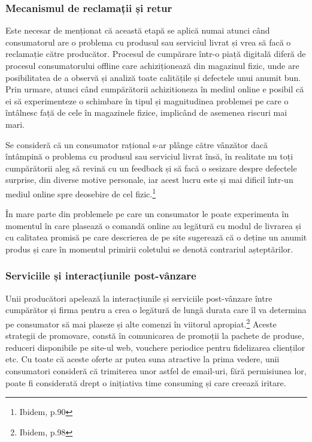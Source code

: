 \documentclass[a4paper, 12pt]{article}
\begin{document}
		\subsubsection{Mecanismul de reclamații și retur}
		
		\quad\quad Este necesar de menționat că această etapă se aplică numai atunci când consumatorul are o problema cu produsul sau serviciul livrat și vrea să facă o reclamație către producător. Procesul de cumpărare într-o piață digitală diferă de procesul consumatorului offline care achiziționează din magazinul fizic, unde are posibilitatea de a observă și analiză toate calitățile și defectele unui anumit bun. Prin urmare, atunci când cumpărătorii achizitioneza în mediul online e posibil că ei să experimenteze o schimbare în tipul și magnitudinea problemei pe care o întâlnesc față de cele în magazinele fizice, implicând de asemenea riscuri mai mari.
		
		\quad Se consideră că un consumator rațional s-ar plânge către vânzător dacă întâmpină o problema cu produsul sau serviciul livrat însă, în realitate nu toți cumpărătorii aleg să revină cu un feedback și să facă o sesizare despre defectele surprise, din diverse motive personale, iar acest lucru este și mai dificil într-un mediul online spre deosebire de cel fizic.\footnote{Ibidem, p.90}
		
		\quad În mare parte din problemele pe care un consumator le poate experimenta în momentul în care plasează o comandă online au legătură cu  modul de livrarea și cu calitatea promisă pe care descrierea de pe site sugerează că o deține un anumit produs și care în momentul primirii coletului se denotă contrariul așteptărilor.
		
		\subsubsection{Serviciile și interacțiunile post-vânzare}
		
		\quad\quad Unii producători apelează la interacțiunile și serviciile post-vânzare între cumpărător și firma pentru a crea o legătură de lungă durata care îl va determina pe consumator să mai plaseze și alte comenzi în viitorul apropiat.\footnote{Ibidem, p.98} Aceste strategii de promovare, constă în comunicarea de promoții la pachete de produse, reduceri disponibile pe site-ul web, vouchere periodice pentru fidelizarea clienților etc. Cu toate că aceste oferte ar putea suna atractive la prima vedere, unii consumatori consideră că trimiterea unor astfel de email-uri, fără permisiunea lor, poate fi considerată drept o inițiativa time consuming și care creează iritare.
		
\end{document}
